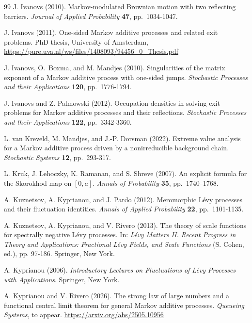 \documentclass[reqno,12pt]{amsart}
\begin{document}
{{\begin{thebibliography}{99}
{\sc J. Ivanovs} (2010).
Markov-modulated Brownian motion with two reflecting barriers. 
{\it Journal of Applied Probability} {\bf 47}, pp.\ 1034-1047.

{\sc J. Ivanovs} (2011).
One-sided Markov additive processes and related exit problems.
PhD thesis, University of Amsterdam, {\footnotesize \url{
https://pure.uva.nl/ws/files/1408093/94456_0_Thesis.pdf}}

{\sc J. Ivanovs, O.\ Boxma,} and {\sc M. Mandjes} (2010).
Singularities of the matrix exponent of a Markov additive process with one-sided jumps.
{\it Stochastic Processes and their Applications} {\bf 120}, pp.\ 1776-1794.

{\sc J. Ivanovs} and {\sc Z. Palmowski} (2012).
Occupation densities in solving exit problems for Markov additive processes and their reflections.
{\it Stochastic Processes and their Applications} {\bf 122}, pp.\ 3342-3360.

{\sc L. van Kreveld, M. Mandjes}, and {\sc J.-P. Dorsman} (2022).
Extreme value analysis for a Markov additive process driven by a nonirreducible background chain. {\it Stochastic Systems} {\bf 12}, pp.\ 293-317.

{\sc L. Kruk, J.  Lehoczky, K. Ramanan,} and {\sc S. Shreve} (2007). 
An explicit formula for the Skorokhod map on $[0,a]$. {\it Annals of  Probability} {\bf 35}, pp.\ 1740–1768. 

{\sc A. Kuznetsov, A. Kyprianou,} and {\sc J. Pardo} (2012).
Meromorphic Lévy processes and their fluctuation identities.
{\it Annals of Applied Probability} {\bf 22}, pp.\ 1101-1135.

{\sc A. Kuznetsov, A. Kyprianou,} and {\sc V. Rivero} (2013).
The theory of scale functions for spectrally
negative L\'evy processes.
In: {\it L\'evy Matters II. Recent Progress in Theory and Applications: Fractional Lévy Fields, and Scale Functions} (S. Cohen, ed.), pp. 97-186. Springer, New York.

{\sc A.  Kyprianou} (2006). 
{\it Introductory Lectures on Fluctuations of L\'evy Processes with Applications}. Springer, New York.

{\sc A. Kyprianou} and {\sc V. Rivero} (2026).
The strong law of large numbers and a functional central limit theorem for general Markov additive processes. {\it Queueing Systems}, to appear.
{\footnotesize \url{
https://arxiv.org/abs/2505.10956}}



\end{thebibliography}}}
\end{document}
